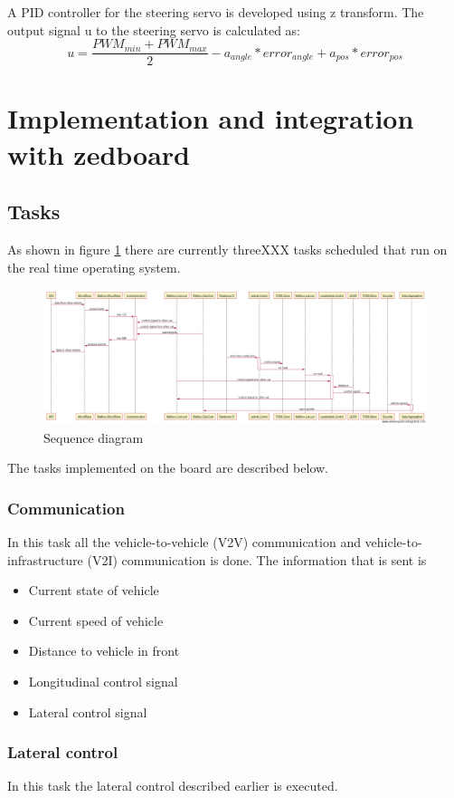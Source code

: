 A PID controller for the steering servo is developed using z transform. The output signal u to the steering servo is calculated as:
$$u = \frac{PWM_{min}+PWM_{max}}{2} - a_{angle}*error_{angle} + a_{pos}*error_{pos}$$

\section{Implementation and integration with zedboard}
\subsection{Tasks}
As shown in figure \ref{fig:sequence diagram} there are currently threeXXX tasks scheduled that run on the real time operating system.

\begin{figure}[H]
  \includegraphics[width=\textwidth]{./img/sekvensdiagram.png}
  \centering
  \caption{Sequence diagram}
  \label{fig:sequence diagram}
\end{figure}
The tasks implemented on the board are described below.
 
\subsubsection{Communication}
In this task all the vehicle-to-vehicle (V2V) communication and vehicle-to-infrastructure (V2I) communication is done. The information that is sent is

\begin{itemize}
  \item Current state of vehicle
  \item Current speed of vehicle
  \item Distance to vehicle in front
  \item Longitudinal control signal
  \item Lateral control signal
\end{itemize}

\subsubsection{Lateral control}
In this task the lateral control described earlier is executed.
